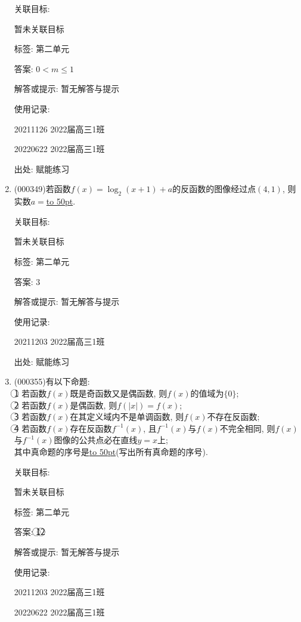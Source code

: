 \documentclass[10pt,a4paper]{article}
\newcommand{\blank}[1]{\underline{\hbox to #1pt{}}}
\begin{document}
\begin{enumerate}[1.]
关联目标:

暂未关联目标



标签: 第二单元

答案: $0<m\le 1$

解答或提示: 暂无解答与提示

使用记录:

20211126	2022届高三1班	

20220622	2022届高三1班  	


出处: 赋能练习
\item { (000349)}若函数$f(x)=\log_2 (x+1)+a$的反函数的图像经过点$(4,1)$, 则实数$a=$\blank{50}.


关联目标:

暂未关联目标



标签: 第二单元

答案: $3$

解答或提示: 暂无解答与提示

使用记录:

20211203	2022届高三1班	


出处: 赋能练习
\item { (000355)}有以下命题:\\
\textcircled{1} 若函数$f(x)$既是奇函数又是偶函数, 则$f(x)$的值域为$\{0\}$; \\
\textcircled{2} 若函数$f(x)$是偶函数, 则$f(|x|)=f(x)$;\\
\textcircled{3} 若函数$f(x)$在其定义域内不是单调函数, 则$f(x)$不存在反函数;\\
\textcircled{4} 若函数$f(x)$存在反函数${{f}^{-1}}(x)$, 且${{f}^{-1}}(x)$与$f(x)$不完全相同, 则$f(x)$与${{f}^{-1}}(x)$图像的公共点必在直线$y=x$上; \\
其中真命题的序号是\blank{50}(写出所有真命题的序号).


关联目标:

暂未关联目标



标签: 第二单元

答案: \textcircled{1}\textcircled{2}

解答或提示: 暂无解答与提示

使用记录:

20211203	2022届高三1班	

20220622	2022届高三1班  	



\end{enumerate}
\end{document}

